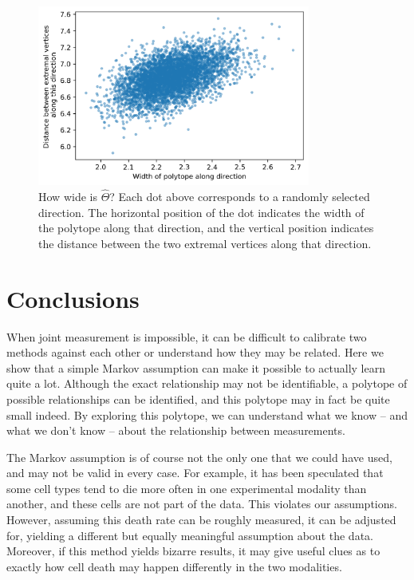 \begin{figure}
\includegraphics[width=0.8\textwidth]{pics/allenwidths}
\caption{How wide is $\hat \Theta$?  Each dot above corresponds to a randomly selected direction.  The horizontal position of the dot indicates the width of the polytope along that direction, and the vertical position indicates the distance between the two extremal vertices along that direction.\label{fig:allenwidths}}
\end{figure}

\section{Conclusions}

When joint measurement is impossible, it can be difficult to calibrate two methods against each other or understand how they may be related.  Here we show that a simple Markov assumption can make it possible to actually learn quite a lot.  Although the exact relationship may not be identifiable, a polytope of possible relationships can be identified, and this polytope may in fact be quite small indeed.  By exploring this polytope, we can understand what we know -- and what we don't know -- about the relationship between measurements.

The Markov assumption is of course not the only one that we could have used, and may not be valid in every case.  For example, it has been speculated that some cell types tend to die more often in one experimental modality than another, and these cells are not part of the data.  This violates our assumptions.  However, assuming this death rate can be roughly measured, it can be adjusted for, yielding a different but equally meaningful assumption about the data.  Moreover, if this method yields bizarre results, it may give useful clues as to exactly how cell death may happen differently in the two modalities.

